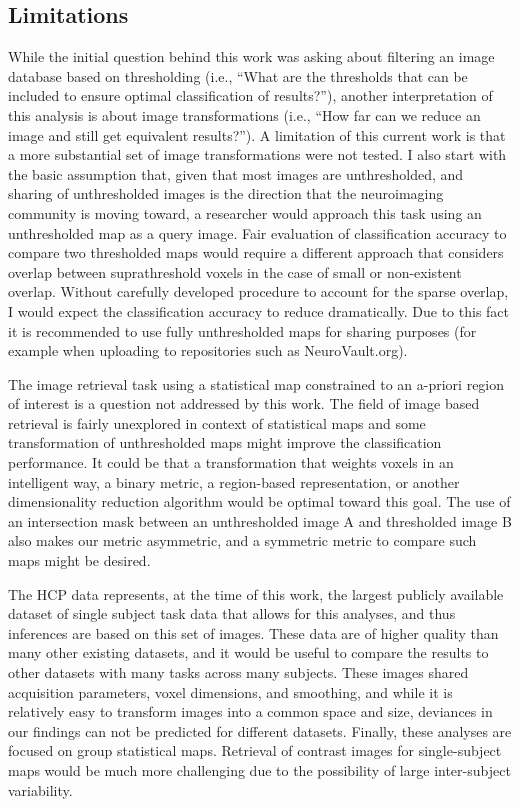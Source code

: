 \documentclass{report}
\begin{document}
\subsection{Limitations}
While the initial question behind this work was asking about filtering
an image database based on thresholding (i.e., ``What are the thresholds
that can be included to ensure optimal classification of results?''),
another interpretation of this analysis is about image transformations
(i.e., ``How far can we reduce an image and still get equivalent
results?''). A limitation of this current work is that a more
substantial set of image transformations were not tested. I also start
with the basic assumption that, given that most images are
unthresholded, and sharing of unthresholded images is the direction that
the neuroimaging community is moving toward, a researcher would approach
this task using an unthresholded map as a query image. Fair evaluation
of classification accuracy to compare two thresholded maps would require
a different approach that considers overlap between suprathreshold
voxels in the case of small or non-existent overlap. Without carefully
developed procedure to account for the sparse overlap, I would expect
the classification accuracy to reduce dramatically. Due to this fact it
is recommended to use fully unthresholded maps for sharing purposes (for
example when uploading to repositories such as NeuroVault.org).

The image retrieval task using a statistical map constrained to an
a-priori region of interest is a question not addressed by this work.
The field of image based retrieval is fairly unexplored in context of
statistical maps and some transformation of unthresholded maps might
improve the classification performance. It could be that a
transformation that weights voxels in an intelligent way, a binary
metric, a region-based representation, or another dimensionality
reduction algorithm would be optimal toward this goal. The use of an
intersection mask between an unthresholded image A and thresholded image B also makes our metric asymmetric, and a symmetric metric to compare
such maps might be desired.

The HCP data represents, at the time of this work, the largest publicly
available dataset of single subject task data that allows for this
analyses, and thus inferences are based on this set of images. These
data are of higher quality than many other existing datasets, and it
would be useful to compare the results to other datasets with many tasks
across many subjects. These images shared acquisition parameters, voxel
dimensions, and smoothing, and while it is relatively easy to transform
images into a common space and size, deviances in our findings can not
be predicted for different datasets. Finally, these analyses are focused
on group statistical maps. Retrieval of contrast images for
single-subject maps would be much more challenging due to the
possibility of large inter-subject variability.
\end{document}
